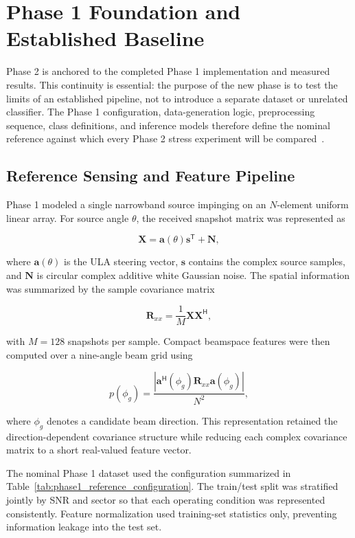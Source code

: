 \section{Phase 1 Foundation and Established Baseline}

Phase 2 is anchored to the completed Phase 1 implementation and measured results. This continuity is essential: the purpose of the new phase is to test the limits of an established pipeline, not to introduce a separate dataset or unrelated classifier. The Phase 1 configuration, data-generation logic, preprocessing sequence, class definitions, and inference models therefore define the nominal reference against which every Phase 2 stress experiment will be compared~\cite{molhem2026phase1}.

\subsection{Reference Sensing and Feature Pipeline}

Phase 1 modeled a single narrowband source impinging on an $N$-element uniform linear array. For source angle $\theta$, the received snapshot matrix was represented as

\[
    \mathbf{X}=\mathbf{a}(\theta)\mathbf{s}^{\mathsf{T}}+\mathbf{N},
\]

where $\mathbf{a}(\theta)$ is the ULA steering vector, $\mathbf{s}$ contains the complex source samples, and $\mathbf{N}$ is circular complex additive white Gaussian noise. The spatial information was summarized by the sample covariance matrix

\[
    \mathbf{R}_{xx}=\frac{1}{M}\mathbf{X}\mathbf{X}^{\mathsf{H}},
\]

with $M=128$ snapshots per sample. Compact beamspace features were then computed over a nine-angle beam grid using

\[
    p(\phi_g)
    =
    \frac{\left|\mathbf{a}^{\mathsf{H}}(\phi_g)
    \mathbf{R}_{xx}
    \mathbf{a}(\phi_g)\right|}{N^2},
\]

where $\phi_g$ denotes a candidate beam direction. This representation retained the direction-dependent covariance structure while reducing each complex covariance matrix to a short real-valued feature vector.

The nominal Phase 1 dataset used the configuration summarized in Table~\ref{tab:phase1_reference_configuration}. The train/test split was stratified jointly by SNR and sector so that each operating condition was represented consistently. Feature normalization used training-set statistics only, preventing information leakage into the test set.

